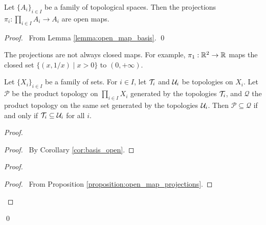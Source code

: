\begin{proposition}
    \label{proposition:open_map_projections}
    Let $\{ A_i \}_{i \in I}$ be a family of topological spaces. Then the projections $\pi_i : \prod_{i \in I} A_i \rightarrow A_i$ are open maps.
\end{proposition}

\begin{proof}
    \pf\ From Lemma \ref{lemma:open_map_basis}. \qed
\end{proof}

\begin{example}
    The projections are not always closed maps. For example, $\pi_1 : \mathbb{R}^2 \rightarrow \mathbb{R}$ maps the closed set $\{ (x,1/x) \mid x > 0 \}$ to $(0, + \infty)$.
\end{example}

\begin{proposition}
    Let $\{ X_i \}_{i \in I}$ be a family of sets. For $i \in I$, let $\mathcal{T}_i$ and $\mathcal{U}_i$ be topologies
    on $X_i$. Let $\mathcal{P}$ be the product topology on $\prod_{i \in I} X_i$ generated by
    the topologies $\mathcal{T}_i$, and $\mathcal{Q}$ the product topology on the same set generated by the topologies
    $\mathcal{U}_i$. Then $\mathcal{P} \subseteq \mathcal{Q}$ if and only if $\mathcal{T}_i \subseteq \mathcal{U}_i$ for all $i$.
\end{proposition}

\begin{proof}
    \pf
    \begin{proof}
        \pf\ By Corollary \ref{cor:basis_open}.
    \end{proof}
    \begin{proof}
        \begin{proof}
            \pf\ From Proposition \ref{proposition:open_map_projections}.
        \end{proof}
    \end{proof}
    \qed
\end{proof}

